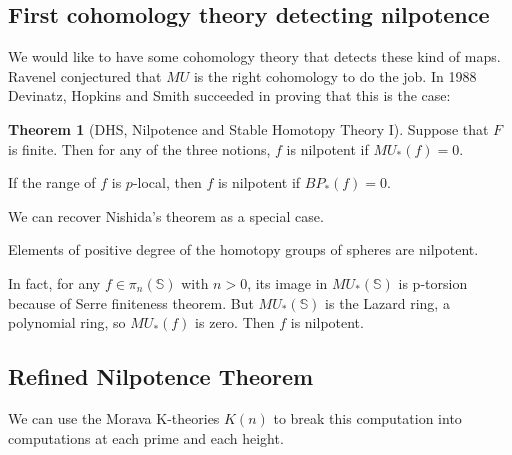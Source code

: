 \documentclass[11pt, oneside]{article}   	%
\theoremstyle{definition}
\newtheorem{thm}{Theorem}
\begin{document}
\subsection{First cohomology theory detecting nilpotence}

We would like to have some cohomology theory that detects these kind of maps. Ravenel conjectured that $MU$ is the right cohomology to do the job. In 1988 Devinatz, Hopkins and Smith succeeded in proving that this is the case:

\begin{thm}
	[DHS, Nilpotence and Stable Homotopy Theory I]
\label{DHS}
	Suppose that $F$ is finite. Then for any of the three notions, $f$ is nilpotent if $MU_*(f)=0$.
\end{thm}

\begin{rmk}
	If the range of $f$ is $p$-local, then $f$ is nilpotent if $BP_*(f)=0$.
\end{rmk}
 
	We can recover Nishida's theorem as a special case.

	Elements of positive degree of the homotopy groups of spheres are nilpotent.

	In fact, for any $f\in \pi_n(\mathbb{S})$ with $n>0$, its image in $MU_*(\mathbb{S})$ is p-torsion because of Serre finiteness theorem. But $MU_*(\mathbb{S})$ is the Lazard ring, a polynomial ring, so $MU_*(f)$ is zero. Then $f$ is nilpotent.
 

\subsection{Refined Nilpotence Theorem}

We can use the Morava K-theories $K(n)$ to break this computation into computations at each prime and each height.
\end{document}
